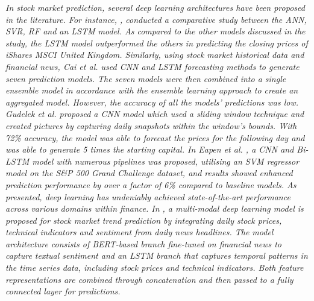 \documentclass[preprint,12pt]{elsarticle}
\begin{document}
\emph{In stock market prediction, several deep learning architectures have been proposed in the literature. For instance, \citep{nikou2019stock}, conducted a comparative study between the ANN, SVR, RF and an LSTM model. As compared to the other models discussed in the study, the LSTM model outperformed the others in predicting the closing prices of iShares MSCI United Kingdom. Similarly, using stock market historical data and financial news, Cai et al. \citep{cai2018financial} used CNN and LSTM forecasting methods to generate seven prediction models. The seven models were then combined into a single ensemble model in accordance with the ensemble learning approach to create an aggregated model. However, the accuracy of all the models' predictions was low. Gudelek et al. \citep{gudelek2017deep} proposed a CNN model which used a sliding window technique and created pictures by capturing daily snapshots within the window's bounds. With 72\% accuracy, the model was able to forecast the prices for the following day and was able to generate 5 times the starting capital. In Eapen et al. \citep{eapen2019novel}, a CNN and Bi-LSTM model with numerous pipelines was proposed, utilising an SVM regressor model on the S\&P 500 Grand Challenge dataset, and results showed enhanced prediction performance by over a factor of 6\% compared to baseline models. As presented, deep learning has undeniably achieved state-of-the-art performance across various domains within finance. In \citep{chen_deep_2024}, a multi-modal deep learning model is proposed for stock market trend prediction by integrating daily stock prices, technical indicators and sentiment from daily news headlines. The model architecture consists of BERT-based branch fine-tuned on financial news to capture textual sentiment and an LSTM branch that captures temporal patterns in the time series data, including stock prices and technical indicators. Both feature representations are combined through concatenation and then passed to a fully connected layer for predictions.}
\end{document}
